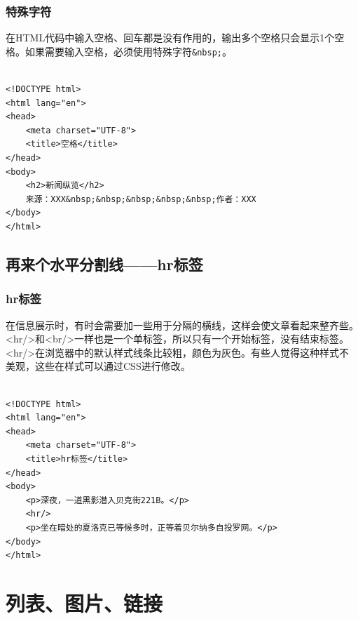 \subsection{特殊字符}

在HTML代码中输入空格、回车都是没有作用的，输出多个空格只会显示1个空格。如果需要输入空格，必须使用特殊字符\lstinline|&nbsp;|。\\

\\

\begin{lstlisting}[style=htmlcssjs]
<!DOCTYPE html>
<html lang="en">
<head>
    <meta charset="UTF-8">
    <title>空格</title>
</head>
<body>
    <h2>新闻纵览</h2>
    来源：XXX&nbsp;&nbsp;&nbsp;&nbsp;&nbsp;作者：XXX
</body>
</html>
\end{lstlisting}

\newpage

\section{再来个水平分割线——hr标签}

\subsection{hr标签}

在信息展示时，有时会需要加一些用于分隔的横线，这样会使文章看起来整齐些。\\

<hr/>和<br/>一样也是一个单标签，所以只有一个开始标签，没有结束标签。\\

<hr/>在浏览器中的默认样式线条比较粗，颜色为灰色。有些人觉得这种样式不美观，这些在样式可以通过CSS进行修改。\\

\\

\begin{lstlisting}[style=htmlcssjs]
<!DOCTYPE html>
<html lang="en">
<head>
    <meta charset="UTF-8">
    <title>hr标签</title>
</head>
<body>
    <p>深夜，一道黑影潜入贝克街221B。</p>
    <hr/>
    <p>坐在暗处的夏洛克已等候多时，正等着贝尔纳多自投罗网。</p>
</body>
</html>
\end{lstlisting}

\newpage

\chapter{列表、图片、链接}

